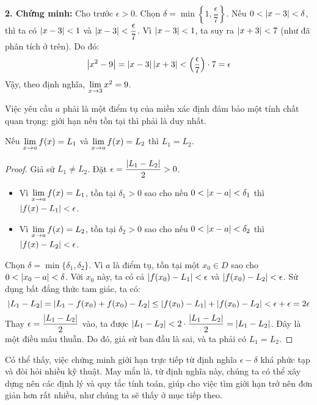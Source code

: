 \textbf{2. Chứng minh:} Cho trước $\epsilon > 0$. Chọn $\delta = \min\left\{1, \dfrac{\epsilon}{7}\right\}$.
Nếu $0 < \left\lvert x-3 \right\rvert < \delta$, thì ta có $\left\lvert x-3 \right\rvert < 1$ và $\left\lvert x-3 \right\rvert < \dfrac{\epsilon}{7}$.
Vì $\left\lvert x-3 \right\rvert < 1$, ta suy ra $\left\lvert x+3 \right\rvert < 7$ (như đã phân tích ở trên).
Do đó:
\begin{equation*}
    \left\lvert x^2 - 9 \right\rvert = \left\lvert x-3 \right\rvert\left\lvert x+3 \right\rvert < \left(\dfrac{\epsilon}{7}\right) \cdot 7 = \epsilon
\end{equation*}
Vậy, theo định nghĩa, $\lim\limits_{x \to 3} x^2 = 9$.

Việc yêu cầu $a$ phải là một điểm tụ của miền xác định đảm bảo một tính chất quan trọng: giới hạn nếu tồn tại thì phải là duy nhất.

\begin{proposition}
    Nếu $\lim\limits_{x \to a} f(x) = L_1$ và $\lim\limits_{x \to a} f(x) = L_2$ thì $L_1 = L_2$.
\end{proposition}
\begin{proof}
    Giả sử $L_1 \neq L_2$. Đặt $\epsilon = \dfrac{\left\lvert L_1 - L_2 \right\rvert}{2} > 0$.
    \begin{itemize}
        \item Vì $\lim\limits_{x \to a} f(x) = L_1$, tồn tại $\delta_1 > 0$ sao cho nếu $0 < \left\lvert x-a \right\rvert < \delta_1$ thì $\left\lvert f(x) - L_1 \right\rvert < \epsilon$.
        \item Vì $\lim\limits_{x \to a} f(x) = L_2$, tồn tại $\delta_2 > 0$ sao cho nếu $0 < \left\lvert x-a \right\rvert < \delta_2$ thì $\left\lvert f(x) - L_2 \right\rvert < \epsilon$.
    \end{itemize}
    Chọn $\delta = \min\{\delta_1, \delta_2\}$. Vì $a$ là điểm tụ, tồn tại một $x_0 \in D$ sao cho $0 < \left\lvert x_0 - a \right\rvert < \delta$.
    Với $x_0$ này, ta có cả $\left\lvert f(x_0) - L_1 \right\rvert < \epsilon$ và $\left\lvert f(x_0) - L_2 \right\rvert < \epsilon$.
    Sử dụng bất đẳng thức tam giác, ta có:
    \begin{equation*}
        \left\lvert L_1 - L_2 \right\rvert = \left\lvert L_1 - f(x_0) + f(x_0) - L_2 \right\rvert \le \left\lvert f(x_0) - L_1 \right\rvert + \left\lvert f(x_0) - L_2 \right\rvert < \epsilon + \epsilon = 2\epsilon
    \end{equation*}
    Thay $\epsilon = \dfrac{\left\lvert L_1 - L_2 \right\rvert}{2}$ vào, ta được $\left\lvert L_1 - L_2 \right\rvert < 2 \cdot \dfrac{\left\lvert L_1 - L_2 \right\rvert}{2} = \left\lvert L_1 - L_2 \right\rvert$.
    Đây là một điều mâu thuẫn. Do đó, giả sử ban đầu là sai, và ta phải có $L_1 = L_2$.
\end{proof}

Có thể thấy, việc chứng minh giới hạn trực tiếp từ định nghĩa $\epsilon-\delta$ khá phức tạp và đòi hỏi nhiều kỹ thuật. May mắn là, từ định nghĩa này, chúng ta có thể xây dựng nên các định lý và quy tắc tính toán, giúp cho việc tìm giới hạn trở nên đơn giản hơn rất nhiều, như chúng ta sẽ thấy ở mục tiếp theo.

